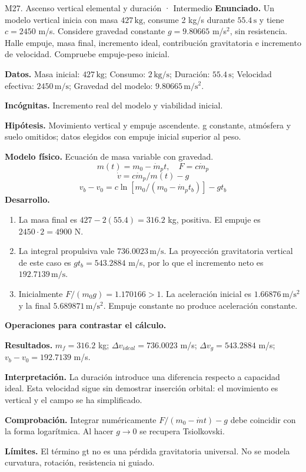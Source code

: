 \begin{studiumworked}{M27. Ascenso vertical elemental y duración · Intermedio}
\textbf{Enunciado.} Un modelo vertical inicia con masa $427\,\mathrm{kg}$, consume 2 kg/s durante $55.4\,\mathrm{s}$ y tiene $c=2450$ m/s. Considere gravedad constante $g=9.80665$ m/s$^2$, sin resistencia. Halle empuje, masa final, incremento ideal, contribución gravitatoria e incremento de velocidad. Compruebe empuje-peso inicial.

\textbf{Datos.} Masa inicial: $427\,\mathrm{kg}$; Consumo: $2\,\mathrm{kg/s}$; Duración: $55.4\,\mathrm{s}$; Velocidad efectiva: $2450\,\mathrm{m/s}$; Gravedad del modelo: $9.80665\,\mathrm{m/s^2}$.

\textbf{Incógnitas.} Incremento real del modelo y viabilidad inicial.

\textbf{Hipótesis.} Movimiento vertical y empuje ascendente. g constante, atmósfera y suelo omitidos; datos elegidos con empuje inicial superior al peso.

\textbf{Modelo físico.} Ecuación de masa variable con gravedad.
\[m(t)=m_0-\dot m_pt,\quad F=c\dot m_p\]
\[\dot v=c\dot m_p/m(t)-g\]
\[v_b-v_0=c\ln[m_0/(m_0-\dot m_pt_b)]-gt_b\]
\textbf{Desarrollo.}
\begin{enumerate}
\item La masa final es $427-2(55.4)=316.2$ kg, positiva. El empuje es $2450\cdot2=4900$ N.
\item La integral propulsiva vale $736.0023\,\mathrm{m/s}$. La proyección gravitatoria vertical de este caso es $g t_b=543.2884$ m/s, por lo que el incremento neto es $192.7139\,\mathrm{m/s}$.
\item Inicialmente $F/(m_0g)=1.170166>1$. La aceleración inicial es $1.66876\,\mathrm{m/s^2}$ y la final $5.689871\,\mathrm{m/s^2}$. Empuje constante no produce aceleración constante.
\end{enumerate}
\textbf{Operaciones para contrastar el cálculo.}

\textbf{Resultados.} $m_f=316.2$ kg; $\Delta v_{ideal}=736.0023$ m/s; $\Delta v_g=543.2884$ m/s; $v_b-v_0=192.7139$ m/s.

\textbf{Interpretación.} La duración introduce una diferencia respecto a capacidad ideal. Esta velocidad sigue sin demostrar inserción orbital: el movimiento es vertical y el campo se ha simplificado.

\textbf{Comprobación.} Integrar numéricamente $F/(m_0-\dot m t)-g$ debe coincidir con la forma logarítmica. Al hacer $g\to0$ se recupera Tsiolkovski.

\textbf{Límites.} El término gt no es una pérdida gravitatoria universal. No se modela curvatura, rotación, resistencia ni guiado.
\end{studiumworked}

